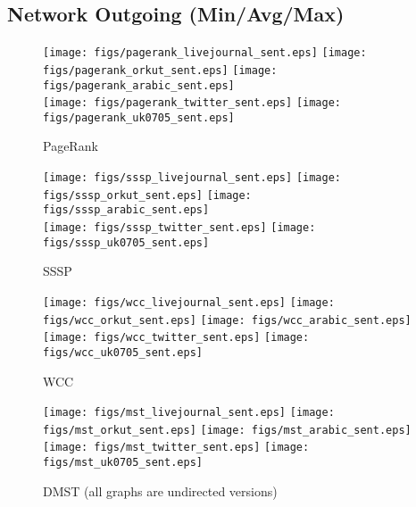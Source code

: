 \documentclass{article}
\newcommand{\bline}[1][1]{\vspace{#1\baselineskip}}
\begin{document}
\pagebreak
\subsection{Network Outgoing (Min/Avg/Max)}
\begin{figure}[!h]
  \bline[1]
  \centering
  \texttt{[image: figs/pagerank\_livejournal\_sent.eps]}\hspace{1em}%
  \texttt{[image: figs/pagerank\_orkut\_sent.eps]}\hspace{1em}%
  \texttt{[image: figs/pagerank\_arabic\_sent.eps]}\\
  \texttt{[image: figs/pagerank\_twitter\_sent.eps]}\hspace{1em}%
  \texttt{[image: figs/pagerank\_uk0705\_sent.eps]}
  \caption{PageRank}
\end{figure}

\begin{figure}[!h]
  \bline[3.5]
  \centering
  \texttt{[image: figs/sssp\_livejournal\_sent.eps]}\hspace{1em}%
  \texttt{[image: figs/sssp\_orkut\_sent.eps]}\hspace{1em}%
  \texttt{[image: figs/sssp\_arabic\_sent.eps]}\\
  \texttt{[image: figs/sssp\_twitter\_sent.eps]}\hspace{1em}%
  \texttt{[image: figs/sssp\_uk0705\_sent.eps]}
  \caption{SSSP}
\end{figure}

\begin{figure}[!h]
  \bline[3.5]
  \centering
  \texttt{[image: figs/wcc\_livejournal\_sent.eps]}\hspace{1em}%
  \texttt{[image: figs/wcc\_orkut\_sent.eps]}\hspace{1em}%
  \texttt{[image: figs/wcc\_arabic\_sent.eps]}\\
  \texttt{[image: figs/wcc\_twitter\_sent.eps]}\hspace{1em}%
  \texttt{[image: figs/wcc\_uk0705\_sent.eps]}
  \caption{WCC}
\end{figure}

\begin{figure}[!h]
  \bline[3.5]
  \centering
  \texttt{[image: figs/mst\_livejournal\_sent.eps]}\hspace{1em}%
  \texttt{[image: figs/mst\_orkut\_sent.eps]}\hspace{1em}%
  \texttt{[image: figs/mst\_arabic\_sent.eps]}\\
  \texttt{[image: figs/mst\_twitter\_sent.eps]}\hspace{1em}%
  \texttt{[image: figs/mst\_uk0705\_sent.eps]}
  \caption{DMST (all graphs are undirected versions)}
\end{figure}
\end{document}
